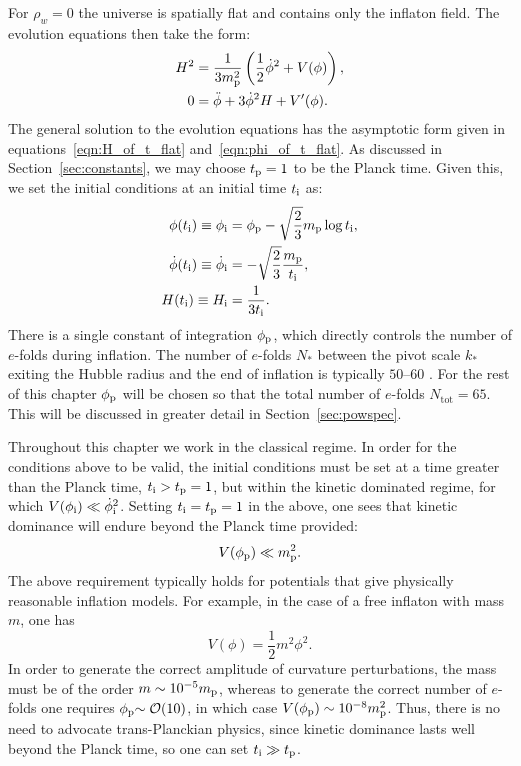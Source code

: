 For \(\rho_w=0\) the universe is spatially flat and contains only the inflaton field. The evolution equations then take the form:
\begin{align}
  H^2 
  &= 
  \frac{1}{3m_{\mathrm{p}}^2}
  \left(\frac{1}{2}\dot{\phi}^2 + V(\phi)\right),
  \label{eqn:Friedmann_eq} 
  \\
  0
  &= 
  \ddot{\phi} +3\dot{\phi}^2H + V^\prime(\phi).
  \label{eqn:Motion_eq_Scalar}
\end{align}
The general solution to the evolution equations has the asymptotic form given in equations~\eqref{eqn:H_of_t_flat} and~\eqref{eqn:phi_of_t_flat}. As discussed in Section~\ref{sec:constants}, we may choose \(t_{\mathrm{p}}=1\) to be the Planck time. Given this, we set the initial conditions at an initial time \(t_{\mathrm{i}}\) as:
\begin{align}
  \phi(t_{\mathrm{i}}) \equiv \phi_{\mathrm{i}}
  &= 
  \phi_{\mathrm{p}} - \sqrt{\frac{2}{3}}m_{\mathrm{p}}\log t_{\mathrm{i}}, 
  \label{eqn:phi_ic}
  \\
  \dot\phi(t_{\mathrm{i}}) 
  \equiv 
  \dot\phi_{\mathrm{i}}
  &= 
  -\sqrt{\frac{2}{3}}\frac{m_{\mathrm{p}}}{t_{\mathrm{i}}}, 
  \label{eqn:phid_ic}
  \\
  H(t_{\mathrm{i}}) 
  \equiv 
  H_{\mathrm{i}}
  &= 
  \frac{1}{3t_{\mathrm{i}}}. 
  \label{eqn:H_ic}
\end{align}
There is a single constant of integration \(\phi_{\mathrm{p}}\), which directly controls the number of \(e\)-folds during inflation. The number of \(e\)-folds \(N_*\) between the pivot scale \(k_*\) exiting the Hubble radius and the end of inflation is typically \(50\)--\(60\) \citep{planck_collaboration_planck_2013-1}. For the rest of this chapter \(\phi_{\mathrm{p}}\) will be chosen so that the total number of \(e\)-folds \(N_\mathrm{tot}=65\). This will be discussed in greater detail in Section~\ref{sec:powspec}.

Throughout this chapter we work in the classical regime. In order for the conditions above to be valid, the initial conditions must be set at a time greater than the Planck time, \(t_{\mathrm{i}} >t_{\mathrm{p}}=1\), but within the kinetic dominated regime, for which \(V(\phi_{\mathrm{i}}) \ll \dot\phi_{\mathrm{i}}^2\). Setting \(t_{\mathrm{i}}=t_{\mathrm{p}}=1\) in the above, one sees that kinetic dominance will endure beyond the Planck time provided:
\begin{equation}
  V(\phi_{\mathrm{p}}) \ll m_{\mathrm{p}}^2.
\end{equation}
The above requirement typically holds for potentials that give physically reasonable inflation models. For example, in the case of a free inflaton with mass \(m\), one has \[ V(\phi) = \frac{1}{2}m^2 \phi^2.\] In order to generate the correct amplitude of curvature perturbations, the mass must be of the order \(m\sim10^{-5}m_{\mathrm{p}}\), whereas to generate the correct number of \(e\)-folds one requires \(\phi_{\mathrm{p}}{\sim\mathcal{O}{\left(10\right)}}\), in which case \(V(\phi_{\mathrm{p}}) \sim 10^{-8} m_{\mathrm{p}}^2\).  Thus, there is no need to advocate trans-Planckian physics, since kinetic dominance lasts well beyond the Planck time, so one can set \(t_{\mathrm{i}} \gg t_{\mathrm{p}}\).


